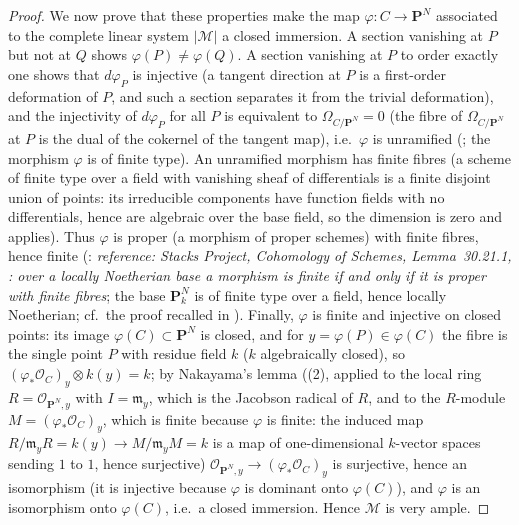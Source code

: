 \begin{proof}
We now prove that these properties make the map
\(\varphi:C\to\mathbf P^N\) associated to the complete linear
system \(|\mathcal M|\) a closed immersion.  A section vanishing
at \(P\) but not at \(Q\) shows \(\varphi(P)\neq\varphi(Q)\).  A
section vanishing at \(P\) to order exactly one shows that
\(d\varphi_P\) is injective (a tangent direction at \(P\) is a
first-order deformation of \(P\), and such a section separates it
from the trivial deformation), and the injectivity of
\(d\varphi_P\) for all \(P\) is equivalent to
\(\Omega_{C/\mathbf P^N}=0\) (the fibre of
\(\Omega_{C/\mathbf P^N}\) at \(P\) is the dual of the cokernel of
the tangent map), i.e.\ \(\varphi\) is unramified
(; the morphism \(\varphi\) is
of finite type).
An unramified morphism has finite fibres (a scheme of finite type
over a field with vanishing sheaf of differentials is a finite
disjoint union of points: its irreducible components have function
fields with no differentials, hence are algebraic over the base
field, so the dimension is zero and
 applies).  Thus \(\varphi\) is proper
(a morphism of proper schemes) with finite fibres, hence finite
(: \emph{reference:
Stacks Project, Cohomology of Schemes, Lemma~30.21.1,
: over a locally Noetherian base a
morphism is finite if and only if it is proper with finite fibres};
the base \(\mathbf P^N_k\) is of finite type over a field, hence
locally Noetherian; cf.\ the proof recalled in
).
Finally, \(\varphi\) is finite and injective on closed points: its
image \(\varphi(C)\subset\mathbf P^N\) is closed, and for
\(y=\varphi(P)\in\varphi(C)\) the fibre is the single point \(P\)
with residue field \(k\) (\(k\) algebraically closed), so
\((\varphi_*\mathcal O_C)_y\otimes k(y)=k\); by Nakayama's lemma
((2), applied to the local ring
\(R=\mathcal O_{\mathbf P^N,y}\) with \(I=\mathfrak m_y\), which is the
Jacobson radical of \(R\), and to the \(R\)-module
\(M=(\varphi_*\mathcal O_C)_y\), which is finite because \(\varphi\) is
finite: the induced map \(R/\mathfrak m_yR=k(y)\to M/\mathfrak m_yM=k\)
is a map of one-dimensional \(k\)-vector spaces sending \(1\) to \(1\),
hence surjective)
\(\mathcal O_{\mathbf P^N,y}\to(\varphi_*\mathcal O_C)_y\) is
surjective, hence an isomorphism (it is injective because
\(\varphi\) is dominant onto \(\varphi(C)\)), and \(\varphi\) is
an isomorphism onto \(\varphi(C)\), i.e.\ a closed immersion.
Hence \(\mathcal M\) is very ample.
\end{proof}

